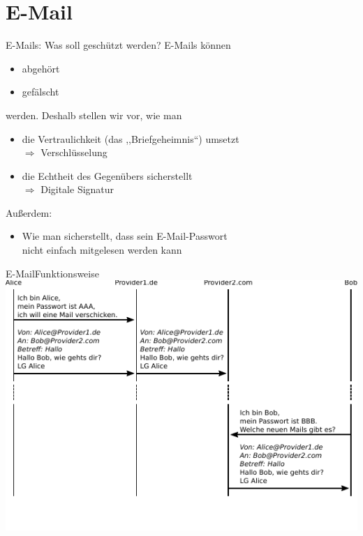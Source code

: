 \section{E-Mail}
\begin{frame}{E-Mails: Was soll geschützt werden?}
  E-Mails können
  \begin{itemize}
    \item abgehört
    \item gefälscht
  \end{itemize}
  werden. Deshalb stellen wir vor, wie man
  \begin{itemize}
    \item die Vertraulichkeit (das ,,Briefgeheimnis``) umsetzt
    \\ $\Rightarrow$ Verschlüsselung
    \item die Echtheit des Gegenübers sicherstellt
    \\ $\Rightarrow$ Digitale Signatur
  \end{itemize}
  Außerdem:
  \begin{itemize}
    \item Wie man sicherstellt, dass sein E-Mail-Passwort\\ nicht einfach mitgelesen werden kann
  \end{itemize}
\end{frame}

\begin{frame}{E-Mail}{Funktionsweise}
  \includegraphics[width=.9\textwidth]{images/maildaten.pdf}
  \scriptsize
  ~\\
  ~\\
\end{frame}

